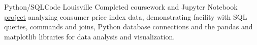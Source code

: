 {Python/SQL}{}{}{Code Louisville}
{Completed coursework and Jupyter Notebook \href{https://github.com/jacobarchambault/cpi-python}{project} analyzing consumer price index data, demonstrating facility with SQL queries, commands and joins, 
	Python database connections and the pandas and matplotlib libraries for data analysis and visualization.}
